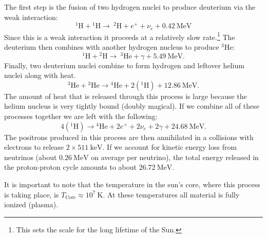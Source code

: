 \documentclass[a4paper,12pt]{article}
\theoremstyle{remark}
\newcommand{\mrm}[1]{\mathrm{#1}}
\renewcommand{\=}[1]{\stackrel{#1}{=}} %
\theoremstyle{plain}
\theoremstyle{definition}
\begin{document}
The first step is the fusion of two hydrogen nuclei to produce deuterium via the weak interaction:
\begin{equation}
^{1} \mathrm{H} + {}^{1}\mathrm{H} \rightarrow \: ^{2}\mathrm{H}+e^{+}+\nu_{e}+0.42 \: \mathrm{MeV}
\end{equation}
Since this is a weak interaction it proceeds at a relatively slow rate.\footnote{This sets the scale for the long lifetime of the Sun.} The deuterium then combines with another hydrogen nucleus to produce $^{3}\mrm{He}$:
\begin{equation}
^{1} \mathrm{H} + {}^{2}\mathrm{H} \rightarrow \: ^{3}\mathrm{He}+\gamma + 5.49 \:\mathrm{MeV}.
\end{equation}
Finally, two deuterium nuclei combine to form hydrogen and leftover helium nuclei along with heat.
\begin{equation}
{}^{3}\mathrm{He} + {}^{3}\mathrm{He} \rightarrow {}^{4}\mathrm{He} + 2({}^{1}\mrm{H}) + 12.86 \:\mrm{MeV}.
\end{equation}
The amount of heat that is released through this process is large because the helium nucleus is very tightly bound (doubly magical). If we combine all of these processes together we are left with the following:
\begin{equation}
4({}^{1}\mathrm{H}) \rightarrow {}^{4}\mathrm{He} + 2e^{+}+ 2\nu_{e} + 2\gamma + 24.68 \:\mrm{MeV}.
\end{equation}
The positrons produced in this process are then annihilated in a collisions with electrons to release $2 \times 511 \:\mrm{keV}$. If we account for kinetic energy loss from neutrinos (about $0.26 \:\mrm{MeV}$ on average per neutrino),  the total energy released in the proton-proton cycle amounts to about  $26.72 \:\mrm{MeV}$. 

It is important to note that the temperature in the sun's core, where this process is taking place, is $T_\mrm{Core} \approx 10^{7} \:\mrm{K}$. At these temperatures all material is fully ionized (plasma). 
\end{document}
